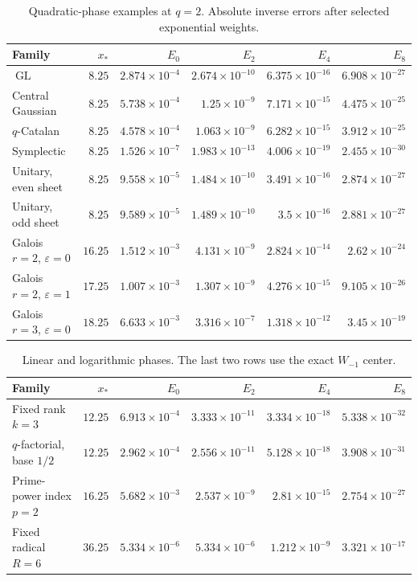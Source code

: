 \documentclass[11pt]{article}
\numberwithin{equation}{section}
\theoremstyle{definition}
\newcommand{\GL}{\operatorname{GL}}
\newcommand{\eps}{\varepsilon}
\begin{document}
\begin{table}[htbp]
\centering\small
\setlength{\tabcolsep}{4pt}
\begin{tabular}{@{}lrrrrr@{}}
\toprule
Family & $x_*$ & $E_0$ & $E_2$ & $E_4$ & $E_8$\\
\midrule
$\GL$ & $8.25$ & $2.874\times10^{-4}$ & $2.674\times10^{-10}$ & $6.375\times10^{-16}$ & $6.908\times10^{-27}$ \\
Central Gaussian & $8.25$ & $5.738\times10^{-4}$ & $1.25\times10^{-9}$ & $7.171\times10^{-15}$ & $4.475\times10^{-25}$ \\
$q$-Catalan & $8.25$ & $4.578\times10^{-4}$ & $1.063\times10^{-9}$ & $6.282\times10^{-15}$ & $3.912\times10^{-25}$ \\
Symplectic & $8.25$ & $1.526\times10^{-7}$ & $1.983\times10^{-13}$ & $4.006\times10^{-19}$ & $2.455\times10^{-30}$ \\
Unitary, even sheet & $8.25$ & $9.558\times10^{-5}$ & $1.484\times10^{-10}$ & $3.491\times10^{-16}$ & $2.874\times10^{-27}$ \\
Unitary, odd sheet & $8.25$ & $9.589\times10^{-5}$ & $1.489\times10^{-10}$ & $3.5\times10^{-16}$ & $2.881\times10^{-27}$ \\
Galois $r=2$, $\eps=0$ & $16.25$ & $1.512\times10^{-3}$ & $4.131\times10^{-9}$ & $2.824\times10^{-14}$ & $2.62\times10^{-24}$ \\
Galois $r=2$, $\eps=1$ & $17.25$ & $1.007\times10^{-3}$ & $1.307\times10^{-9}$ & $4.276\times10^{-15}$ & $9.105\times10^{-26}$ \\
Galois $r=3$, $\eps=0$ & $18.25$ & $6.633\times10^{-3}$ & $3.316\times10^{-7}$ & $1.318\times10^{-12}$ & $3.45\times10^{-19}$ \\
\bottomrule
\end{tabular}
\caption{Quadratic-phase examples at $q=2$. Absolute inverse errors after selected exponential weights.}
\end{table}

\begin{table}[htbp]
\centering\small
\setlength{\tabcolsep}{4pt}
\begin{tabular}{@{}lrrrrr@{}}
\toprule
Family & $x_*$ & $E_0$ & $E_2$ & $E_4$ & $E_8$\\
\midrule
Fixed rank $k=3$ & $12.25$ & $6.913\times10^{-4}$ & $3.333\times10^{-11}$ & $3.334\times10^{-18}$ & $5.338\times10^{-32}$ \\
$q$-factorial, base $1/2$ & $12.25$ & $2.962\times10^{-4}$ & $2.556\times10^{-11}$ & $5.128\times10^{-18}$ & $3.908\times10^{-31}$ \\
Prime-power index $p=2$ & $16.25$ & $5.682\times10^{-3}$ & $2.537\times10^{-9}$ & $2.81\times10^{-15}$ & $2.754\times10^{-27}$ \\
Fixed radical $R=6$ & $36.25$ & $5.334\times10^{-6}$ & $5.334\times10^{-6}$ & $1.212\times10^{-9}$ & $3.321\times10^{-17}$ \\
\bottomrule
\end{tabular}
\caption{Linear and logarithmic phases. The last two rows use the exact $W_{-1}$ center.}
\end{table}
\end{document}
